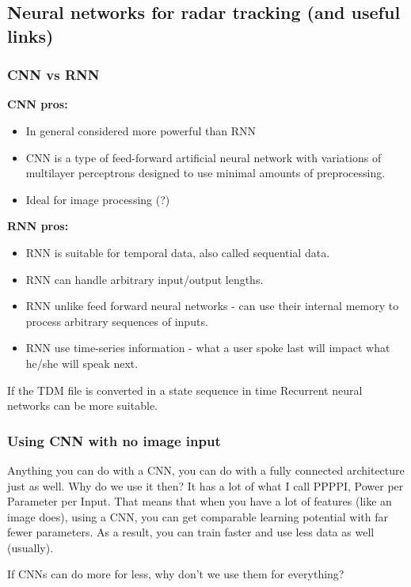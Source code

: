 \documentclass[11pt]{article}
\begin{document}
\begin{enumerate}
\subsection{Neural networks for radar tracking (and useful links)}
\subsubsection{CNN vs RNN}

\textbf{CNN pros:}

\begin{itemize}
    \item In general considered more powerful than RNN
    \item CNN is a type of feed-forward artificial neural network with variations of multilayer perceptrons designed to use minimal amounts of preprocessing.
    \item Ideal for image processing (?)
\end{itemize}

\textbf{RNN pros:}

\begin{itemize}
    \item RNN is suitable for temporal data, also called sequential data.
    \item RNN can handle arbitrary input/output lengths.
    \item RNN unlike feed forward neural networks - can use their internal memory to process arbitrary sequences of inputs.
    \item RNN use time-series information - what a user spoke last will impact what he/she will speak next.
\end{itemize}

If the TDM file is converted in a state sequence in time Recurrent neural networks can be more suitable. 

\subsubsection{Using CNN with no image input}
Anything you can do with a CNN, you can do with a fully connected architecture just as well. Why do we use it then? It has a lot of what I call PPPPI, Power per Parameter per Input. That means that when you have a lot of features (like an image does), using a CNN, you can get comparable learning potential with far fewer parameters. As a result, you can train faster and use less data as well (usually).

If CNNs can do more for less, why don't we use them for everything?


\end{enumerate}
\end{document}
